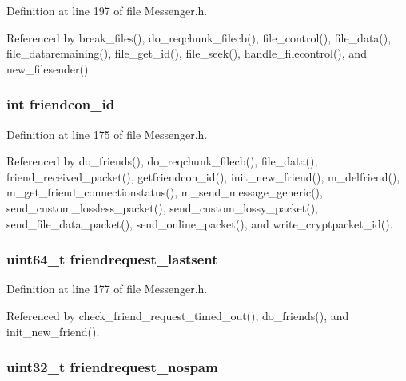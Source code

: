 Definition at line 197 of file Messenger.\+h.



Referenced by break\+\_\+files(), do\+\_\+reqchunk\+\_\+filecb(), file\+\_\+control(), file\+\_\+data(), file\+\_\+dataremaining(), file\+\_\+get\+\_\+id(), file\+\_\+seek(), handle\+\_\+filecontrol(), and new\+\_\+filesender().

\hypertarget{struct_friend_aed1c0bb5aeba492059252d0084c8ae9b}{
\subsubsection[{friendcon\+\_\+id}]{\setlength{\rightskip}{0pt plus 5cm}int friendcon\+\_\+id}}\label{struct_friend_aed1c0bb5aeba492059252d0084c8ae9b}


Definition at line 175 of file Messenger.\+h.



Referenced by do\+\_\+friends(), do\+\_\+reqchunk\+\_\+filecb(), file\+\_\+data(), friend\+\_\+received\+\_\+packet(), getfriendcon\+\_\+id(), init\+\_\+new\+\_\+friend(), m\+\_\+delfriend(), m\+\_\+get\+\_\+friend\+\_\+connectionstatus(), m\+\_\+send\+\_\+message\+\_\+generic(), send\+\_\+custom\+\_\+lossless\+\_\+packet(), send\+\_\+custom\+\_\+lossy\+\_\+packet(), send\+\_\+file\+\_\+data\+\_\+packet(), send\+\_\+online\+\_\+packet(), and write\+\_\+cryptpacket\+\_\+id().

\hypertarget{struct_friend_a1cea2470caaf4282313efe944e95bf35}{
\subsubsection[{friendrequest\+\_\+lastsent}]{\setlength{\rightskip}{0pt plus 5cm}uint64\+\_\+t friendrequest\+\_\+lastsent}}\label{struct_friend_a1cea2470caaf4282313efe944e95bf35}


Definition at line 177 of file Messenger.\+h.



Referenced by check\+\_\+friend\+\_\+request\+\_\+timed\+\_\+out(), do\+\_\+friends(), and init\+\_\+new\+\_\+friend().

\hypertarget{struct_friend_a0fae9801a4789a368f90125119e31f3f}{
\subsubsection[{friendrequest\+\_\+nospam}]{\setlength{\rightskip}{0pt plus 5cm}uint32\+\_\+t friendrequest\+\_\+nospam}}\label{struct_friend_a0fae9801a4789a368f90125119e31f3f}


